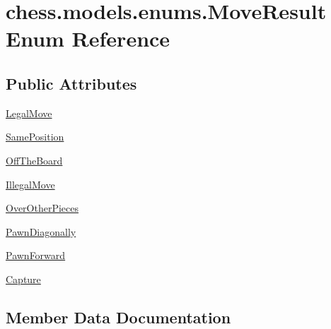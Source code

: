 \hypertarget{enumchess_1_1models_1_1enums_1_1_move_result}{}\section{chess.\+models.\+enums.\+Move\+Result Enum Reference}
\label{enumchess_1_1models_1_1enums_1_1_move_result}
\subsection*{Public Attributes}
\begin{DoxyCompactItemize}
\item 
\mbox{\hyperlink{enumchess_1_1models_1_1enums_1_1_move_result_aeddb30a26d5d3b05cd22b29ec58b2f2a}{Legal\+Move}}
\item 
\mbox{\hyperlink{enumchess_1_1models_1_1enums_1_1_move_result_ae2f055341a4c6c1c1f3af4437bd0f2d2}{Same\+Position}}
\item 
\mbox{\hyperlink{enumchess_1_1models_1_1enums_1_1_move_result_a683e7b2ca9cb704751385cac155a0cae}{Off\+The\+Board}}
\item 
\mbox{\hyperlink{enumchess_1_1models_1_1enums_1_1_move_result_a4af26e0458f35e2a9c82aa2c27ca134f}{Illegal\+Move}}
\item 
\mbox{\hyperlink{enumchess_1_1models_1_1enums_1_1_move_result_a2717354dfa6f1002293272f66555edcc}{Over\+Other\+Pieces}}
\item 
\mbox{\hyperlink{enumchess_1_1models_1_1enums_1_1_move_result_af4f997ded0a66f0482e263ce6870eba2}{Pawn\+Diagonally}}
\item 
\mbox{\hyperlink{enumchess_1_1models_1_1enums_1_1_move_result_a4f2ef96f4dc4898048a590c502850a54}{Pawn\+Forward}}
\item 
\mbox{\hyperlink{enumchess_1_1models_1_1enums_1_1_move_result_ae617756d07a37d5282a3f680a2dfca3d}{Capture}}
\end{DoxyCompactItemize}


\subsection{Member Data Documentation}
\mbox{\label{enumchess_1_1models_1_1enums_1_1_move_result_ae617756d07a37d5282a3f680a2dfca3d}} 
